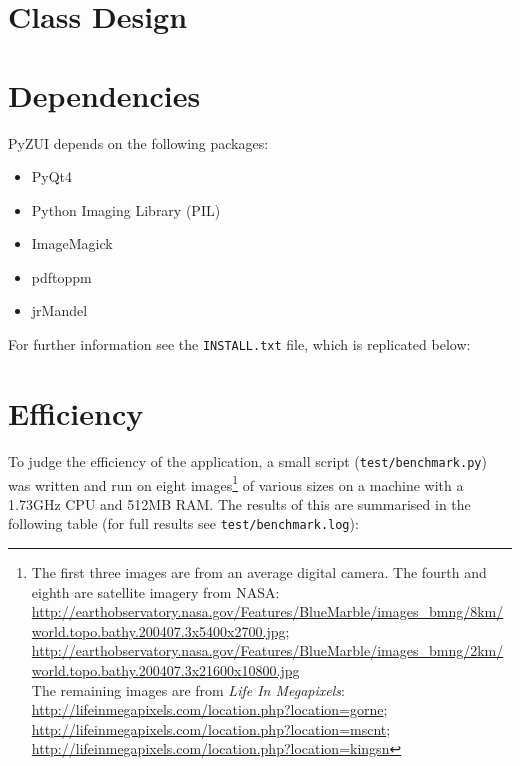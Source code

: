 \documentclass{report}
\begin{document}
  \chapter{Class Design}
  \minitoc
  

  \chapter{Dependencies}
  PyZUI depends on the following packages:
  \begin{itemize}
    \item PyQt4
    \item Python Imaging Library (PIL)
    \item ImageMagick
    \item pdftoppm
    \item jrMandel
  \end{itemize}

  For further information see the \texttt{INSTALL.txt} file, which is
  replicated below:
  {\footnotesize}
  
  \chapter{Efficiency}
  To judge the efficiency of the application, a small script
  (\texttt{test/benchmark.py}) was written and run on eight images\footnote{
    The first three images are from an average digital camera. The fourth and
    eighth are satellite imagery from NASA:
    \url{http://earthobservatory.nasa.gov/Features/BlueMarble/images_bmng/8km/
         world.topo.bathy.200407.3x5400x2700.jpg};
    \url{http://earthobservatory.nasa.gov/Features/BlueMarble/images_bmng/2km/
         world.topo.bathy.200407.3x21600x10800.jpg} \\
    The remaining images are from \emph{Life In Megapixels}:
    \url{http://lifeinmegapixels.com/location.php?location=gorne};
    \url{http://lifeinmegapixels.com/location.php?location=mscnt};
    \url{http://lifeinmegapixels.com/location.php?location=kingsn}
  } of various sizes on a machine with a 1.73GHz CPU and 512MB RAM. The results
  of this are summarised in the following table (for full results see
  \texttt{test/benchmark.log}):
\end{document}
